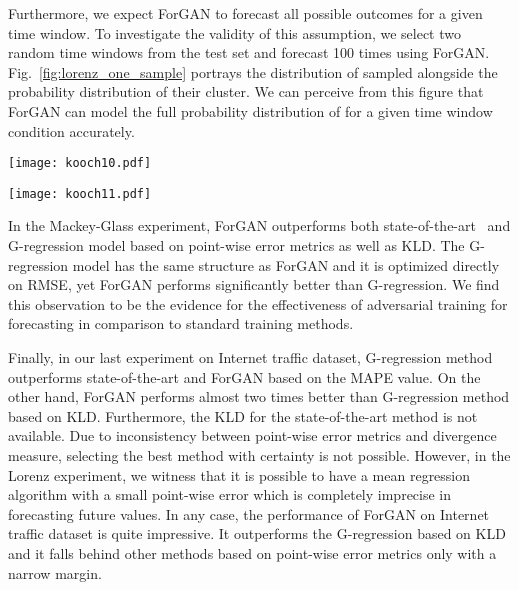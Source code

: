\documentclass{ieeeaccess}
\begin{document}
Furthermore, we expect ForGAN to forecast all possible outcomes for a given time window. To investigate the validity of this assumption, we select two random time windows from the test set and forecast  100 times using ForGAN. Fig.~\ref{fig:lorenz_one_sample} portrays the distribution of sampled   alongside the probability distribution of their cluster. We can perceive from this figure that ForGAN can model the full probability distribution of  for a given time window condition accurately.
\begin{figure*}
	\centering
	\texttt{[image: kooch10.pdf]}
	\caption{The prediction of  produced by ForGAN (blue), G-regression (green) alongside the ground truth distribution (orange) for each time window cluster  and for the entire dataset on the Lorenz dataset.}
	\label{fig:reg_lorenz}
\end{figure*}
\begin{figure*}
	\centering
	\texttt{[image: kooch11.pdf]}
	\caption{The probability distribution of  learned by ForGAN for two randomly selected time windows  and the data distribution of the time window cluster they origin from on Lorenz dataset.}
	\label{fig:lorenz_one_sample}
\end{figure*}
\medskip

In the Mackey-Glass experiment, ForGAN outperforms both state-of-the-art~\cite{mendez2017competitive} and G-regression model based on point-wise error metrics as well as KLD. The G-regression model has the same structure as ForGAN and it is optimized directly on RMSE, yet ForGAN performs significantly better than G-regression. We find this observation to be the evidence for the effectiveness of adversarial training for forecasting in comparison to standard training methods.

\medskip

Finally, in our last experiment on Internet traffic dataset, G-regression method outperforms state-of-the-art and ForGAN based on the MAPE value. On the other hand, ForGAN performs almost two times better than G-regression method based on KLD. Furthermore, the KLD for the state-of-the-art method is not available. Due to inconsistency between point-wise error metrics and divergence measure, selecting the best method with certainty is not possible.
However, in the Lorenz experiment, we witness that it is possible to have a mean regression algorithm with a small point-wise error which is completely imprecise in forecasting future values. In any case, the performance of ForGAN on Internet traffic dataset is quite impressive. It outperforms the G-regression based on KLD and it falls behind other methods based on point-wise error metrics only with a narrow margin.
\end{document}
